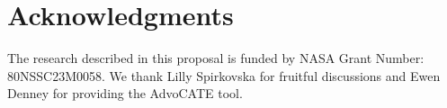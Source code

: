 \section{Acknowledgments}
The research described in this proposal is funded by NASA Grant Number: 80NSSC23M0058. We thank  Lilly Spirkovska for fruitful discussions and Ewen  Denney for providing the AdvoCATE tool.
